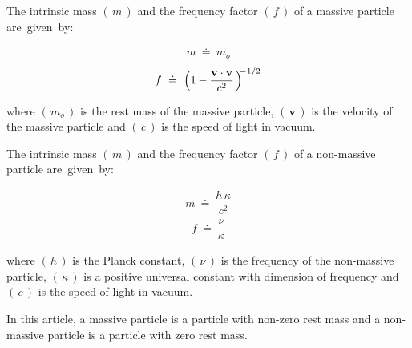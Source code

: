 \documentclass[10pt,fleqn]{article}
\begin{document}
\noindent The intrinsic mass $( \, m \, )$ and the frequency factor $( \, f \, )$ of a massive particle \hbox {are given by}:
\par \vspace{-0.60em}
\begin{eqnarray*}
m ~\doteq~ m_o
\end{eqnarray*}
\vspace{-0.90em}
\begin{eqnarray*}
f ~\doteq~ \Big ( 1 - \dfrac{\mathbf{v} \cdot \mathbf{v}}{c^2} \hspace{+0.15em} \Big )^{\hspace{-0.24em}-\hspace{+0.03em}1/2}
\end{eqnarray*}
\par \vspace{+0.60em}
\noindent where $( \, m_o \, )$ is the rest mass of the massive particle, $( \, \mathbf{v} \, )$ is the velocity of the massive particle and $( \, c \, )$ is the speed of light in vacuum.
\par \vspace{+0.60em}
\noindent The intrinsic mass $( \, m \, )$ and the frequency factor $( \, f \, )$ of a non-massive particle \hbox {are given by}:
\par \vspace{-0.60em}
\begin{eqnarray*}
m ~\doteq~ \dfrac{h \, \kappa}{c^2}
\end{eqnarray*}
\vspace{-0.60em}
\begin{eqnarray*}
f ~\doteq~ \dfrac{\nu}{\kappa}
\end{eqnarray*}
\par \vspace{+0.60em}
\noindent where $( \, h \, )$ is the Planck constant, $( \, \nu \, )$ is the frequency of the non-massive particle, $( \, \kappa \, )$ is a positive universal constant with dimension of frequency and $( \, c \, )$ is the speed of light in vacuum.
\par \vspace{+0.60em}
\noindent In this article, a massive particle is a particle with non-zero rest mass and a non-massive particle is a particle with zero rest mass.

\newpage

\par {}
\end{document}
